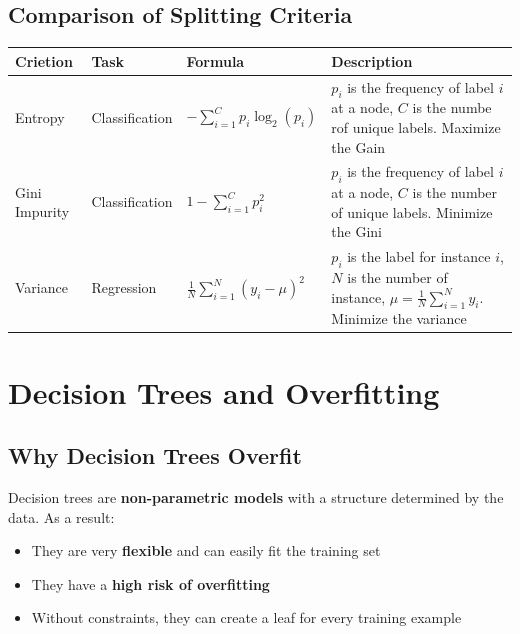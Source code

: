 \documentclass[a4paper]{article}
\theoremstyle{definition}
\begin{document}
\subsection{Comparison of Splitting Criteria}
\begin{table}
    \centering 
    \begin{tabular}{|l|l|l|p{5.5cm}|}
        \hline 
        \textbf{Crietion} & \textbf{Task} & \textbf{Formula} & \textbf{Description}\\
        \hline
        Entropy & Classification & \( - \sum_{i = 1}^{C} p_i \log_2(p_i) \) & \( p_i \) is the frequency of label \( i \) at a node, \( C \) is the numbe rof unique labels. Maximize the Gain \\
        \hline
        Gini Impurity & Classification & \( 1 - \sum_{i = 1}^{C} p_i^2 \) & \( p_i \) is the frequency of label \( i \) at a node, \( C \) is the number of unique labels. Minimize the Gini \\
        \hline
        Variance & Regression & \( \frac{1}{N} \sum_{i = 1}^{N} (y_i - \mu)^2 \) & \( p_i \) is the label for instance \( i \), \( N \) is the number of instance, \( \mu = \frac{1}{N} \sum_{i = 1}^N y_i \). Minimize the variance \\
        \hline 
    \end{tabular}
\end{table}
\section{Decision Trees and Overfitting}
\subsection{Why Decision Trees Overfit}
Decision trees are \textbf{non-parametric models} with a structure determined by the data. As a result:
\begin{itemize}
    \item They are very \textbf{flexible} and can easily fit the training set
    \item They have a \textbf{high risk of overfitting} 
    \item Without constraints, they can create a leaf for every training example
\end{itemize}
\end{document}
